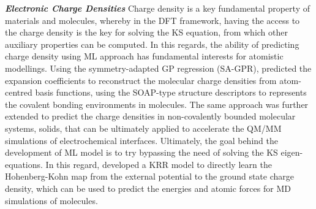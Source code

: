\textbf{\textit{Electronic Charge Densities}} Charge density is a key fundamental property of materials and molecules, whereby in the DFT framework, having the access to the charge density is the key for solving the KS equation, from which other auxiliary properties can be computed. In this regards, the ability of predicting charge density using ML approach has fundamental interests for atomistic modellings. Using the symmetry-adapted GP regression (SA-GPR), 
\citet{grisafi2018transferable}  predicted the expansion coefficients to reconstruct the molecular charge densities from atom-centred basis functions, using the SOAP-type\cite{bartok2013representing} structure descriptors to represents the covalent bonding environments in molecules. 
The same approach was further extended to predict the charge densities in non-covalently bounded molecular systems,\cite{fabrizio2019electron} solids,\cite{lewis2021learning} that can be ultimately applied to accelerate the QM/MM simulations of electrochemical interfaces.\cite{grisafi2024accelerating} Ultimately, the goal behind the development of ML model is to try bypassing the need of solving the KS eigen-equations. 
In this regard, \citet{brockherde2017bypassing} developed a KRR model to directly learn the Hohenberg-Kohn map from the external potential to the ground state charge density, which can be used to predict the energies and atomic forces for MD simulations of molecules.
 
